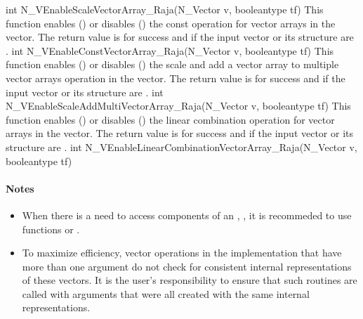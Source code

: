 {
  int N\_VEnableScaleVectorArray\_Raja(N\_Vector v, booleantype tf)
}
{
  This function enables () or disables () the const
  operation for vector arrays in the {\raja} vector. The return value is  for
  success and  if the input vector or its  structure are .
}
{
  int N\_VEnableConstVectorArray\_Raja(N\_Vector v, booleantype tf)
}
{
  This function enables () or disables () the scale and
  add a vector array to multiple vector arrays operation in the {\raja} vector. The
  return value is  for success and  if the input vector or its
   structure are .
}
{
  int N\_VEnableScaleAddMultiVectorArray\_Raja(N\_Vector v, booleantype tf)
}
{
  This function enables () or disables () the linear
  combination operation for vector arrays in the {\raja} vector. The return value
  is  for success and  if the input vector or its  structure
  are .
}
{
  int N\_VEnableLinearCombinationVectorArray\_Raja(N\_Vector v,
  booleantype tf)
}
\paragraph{\bf Notes}

\begin{itemize}

\item
  When there is a need to access components of an , ,
  it is recommeded to use functions  or
  .


\item
  {\warn}To maximize efficiency, vector operations in the {\nvecraja} implementation
  that have more than one  argument do not check for
  consistent internal representations of these vectors. It is the user's
  responsibility to ensure that such routines are called with 
  arguments that were all created with the same internal representations.

\end{itemize}
